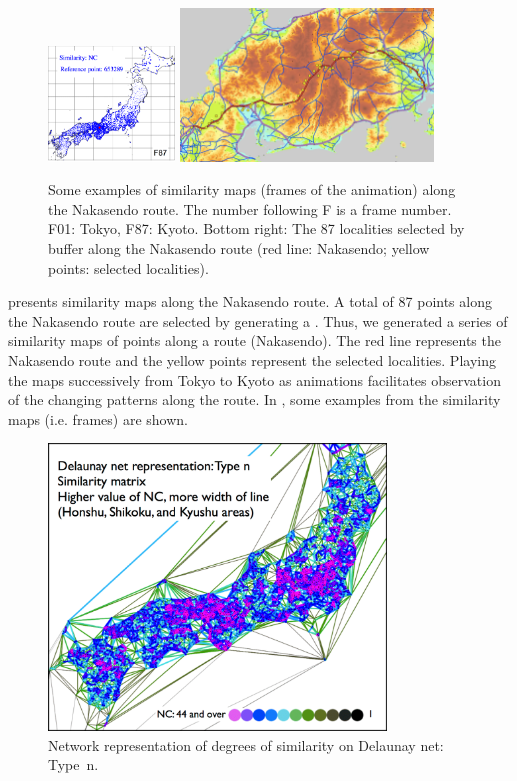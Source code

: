 \documentclass[output=paper]{LSP/langsci}
\begin{document}
\begin{figure}[b]
\\
\includegraphics[width=0.3\textwidth]{illustrations/kuma_fig21-F87}
\includegraphics[width=0.6\textwidth]{illustrations/kuma_fig21-Points}
\caption{Some examples of similarity maps (frames of the animation) along the Nakasendo route. The number following F is a frame number. F01: Tokyo, F87: Kyoto. Bottom right: The 87 localities selected by buffer along the Nakasendo route (red line: Nakasendo; yellow points: selected localities).}          
\label{fig:kuma:21}
\end{figure}

 presents similarity maps along the Nakasendo route. A total of 87 points along the Nakasendo route are selected by generating a . Thus, we generated a series of similarity maps of points along a route (Nakasendo). The red line represents the Nakasendo route and the yellow points represent the selected localities. Playing the maps successively from Tokyo to Kyoto as animations facilitates observation of the changing patterns along the route. In , some examples from the similarity maps (i.e. frames) are shown.



\begin{figure}[t]
\includegraphics[width=0.8\textwidth]{illustrations/kuma_fig22}
\caption{Network representation of degrees of similarity on Delaunay net: Type~n.}
\label{fig:kuma:22}
\end{figure}
\end{document}
